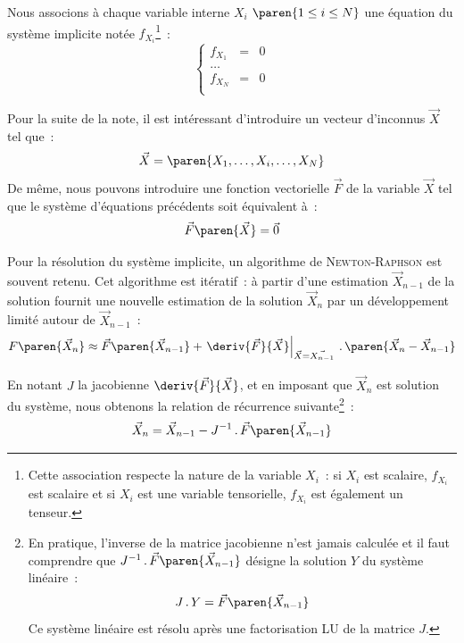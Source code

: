\documentclass[12pt]{article}
\begin{document}
Nous associons à chaque variable interne \(X_{i}\) \(\paren{1\leq i\leq
N}\) une équation du système implicite notée
\(f_{X_{i}}\)\footnote{Cette association respecte la nature de la variable
\(X_{i}\)~: si \(X_{i}\) est scalaire, \(f_{X_{i}}\) est scalaire et si
\(X_{i}\) est une variable tensorielle, \(f_{X_{i}}\) est également un
tenseur.}~:
\[
\left\{
\begin{array}{ccc}
f_{X_{1}} & = & 0 \\
\ldots \\
f_{X_{N}} & = & 0 \\
\end{array} \right.
\]

Pour la suite de la note, il est intéressant d'introduire un vecteur
d'inconnus \(\vec{X}\) tel que~:
\[
\vec{X} = \paren{X_{1},\ldots,X_{i},\ldots,X_{N}}
\]
De même, nous pouvons introduire une fonction vectorielle \(\vec{F}\) de
la variable \(\vec{X}\) tel que le système d'équations précédents soit
équivalent à~:
\[
\vec{F}\paren{\vec{X}} = \vec{0}
\]

Pour la résolution du système implicite, un algorithme de
\textsc{Newton-Raphson} est souvent retenu. Cet algorithme est
itératif~: à partir d'une estimation \(\vec{X}_{n-1}\) de la solution
fournit une nouvelle estimation de la solution \(\vec{X}_{n}\) par un
développement limité autour de \(\vec{X}_{n-1}\)~:
\[
\begin{aligned}
F\paren{\vec{X}_{n}} &\approx \vec{F}\paren{\vec{X}_{n-1}}+\left.\deriv{\vec{F}}{\vec{X}}\right|_{\vec{X}=\vec{X_{n-1}}}\,.\,\paren{\vec{X}_{n}-\vec{X}_{n-1}} \\
\end{aligned}
\]

En notant \(J\) la jacobienne \(\deriv{\vec{F}}{\vec{X}}\), et en
imposant que \(\vec{X}_{n}\) est solution du système, nous
obtenons la relation de récurrence suivante\footnote{En pratique,
 l'inverse de la matrice jacobienne n'est jamais calculée et il faut
  comprendre que \(J^{-1}\,.\,\vec{F}\paren{\vec{X}_{n-1}}\) désigne
  la solution \(Y\) du système linéaire~:
  \[
  J\,.\,Y = \vec{F}\paren{\vec{X}_{n-1}}
  \]
  Ce système linéaire est résolu après une factorisation LU de la
  matrice \(J\).}~:
\begin{equation}
  \label{eq:NR}
  \vec{X}_{n}=\vec{X}_{n-1}-J^{-1}\,.\,\vec{F}\paren{\vec{X}_{n-1}}
\end{equation}
\end{document}
